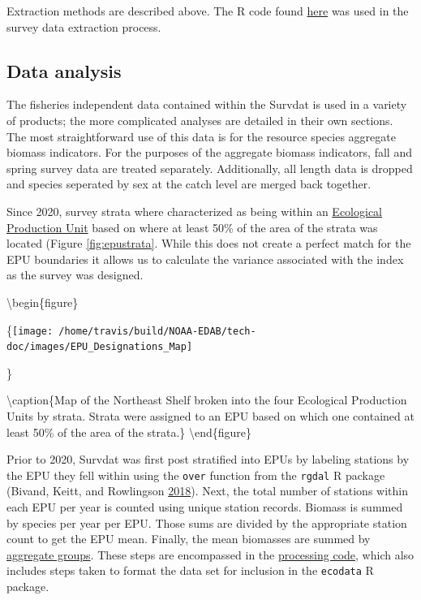 \documentclass[
]{book}
\begin{document}
Extraction methods are described above. The R code found \href{https://github.com/slucey/RSurvey/blob/master/Survdat.r}{here} was used in the survey data extraction process.

\hypertarget{data-analysis-39}{%
\subsection{Data analysis}\label{data-analysis-39}}

The fisheries independent data contained within the Survdat is used in a variety of
products; the more complicated analyses are detailed in their own sections. The most straightforward use of this data is for the resource species aggregate biomass
indicators. For the purposes of the aggregate biomass indicators, fall and spring
survey data are treated separately. Additionally, all length data is dropped and
species seperated by sex at the catch level are merged back together.

Since 2020, survey strata where characterized as being within an \protect\hyperlink{epu}{Ecological Production Unit}
based on where at least 50\% of the area of the strata was located (Figure \ref{fig:epustrata}. While this does not
create a perfect match for the EPU boundaries it allows us to calculate the variance
associated with the index as the survey was designed.

\textbackslash begin\{figure\}

\{\centering \texttt{[image: /home/travis/build/NOAA-EDAB/tech-doc/images/EPU\_Designations\_Map]}

\}

\textbackslash caption\{Map of the Northeast Shelf broken into the four Ecological Production Units by strata. Strata were assigned to an EPU based on which one contained at least 50\% of the area of the strata.\}\label{fig:epustrata}
\textbackslash end\{figure\}

Prior to 2020, Survdat was first post stratified into EPUs by labeling stations by the EPU they fell within
using the \texttt{over} function from the \texttt{rgdal} R package (Bivand, Keitt, and Rowlingson \protect\hyperlink{ref-rgdal}{2018}). Next, the total number
of stations within each EPU per year is counted using unique station records. Biomass
is summed by species per year per EPU. Those sums are divided by the appropriate
station count to get the EPU mean. Finally, the mean biomasses are summed by \protect\hyperlink{aggroups}{aggregate groups}. These steps are encompassed in the \href{https://github.com/NOAA-EDAB/ecodata/blob/master/data-raw/get_agg_bio.R}{processing code}, which also includes steps taken to format the data set for inclusion in the \texttt{ecodata} R package.
\end{document}
